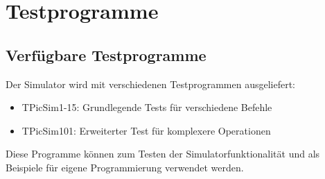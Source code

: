 \documentclass[a4paper,11pt]{report}
\begin{document}
\chapter{Testprogramme}

\section{Verfügbare Testprogramme}
Der Simulator wird mit verschiedenen Testprogrammen ausgeliefert:

\begin{itemize}
    \item TPicSim1-15: Grundlegende Tests für verschiedene Befehle
    \item TPicSim101: Erweiterter Test für komplexere Operationen
\end{itemize}

Diese Programme können zum Testen der Simulatorfunktionalität und als Beispiele für eigene Programmierung verwendet werden.
\end{document}
